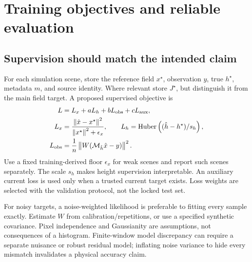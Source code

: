 \section{Training objectives and reliable evaluation}
\label{sec:training}
\subsection{Supervision should match the intended claim}
For each simulation scene, store the reference field $x^\star$, observation $y$, true $h^\star$, metadata $m$, and source identity. Where relevant store $J^\star$, but distinguish it from the main field target. A proposed supervised objective is
\begin{align}
 L &=L_x+aL_h+bL_{\rm obs}+cL_{\rm aux},\\
 L_x&=\frac{\left\lVert\hat x-x^\star\right\rVert^2}{\left\lVert x^\star\right\rVert^2+\epsilon_x},\qquad
 L_h=\operatorname{Huber}\left((\hat h-h^\star)/s_h\right),\\
 L_{\rm obs}&=\frac1{n}\left\lVert W(\mathcal M_{\hat h}\hat x-y)\right\rVert^2.
\end{align}
Use a fixed training-derived floor $\epsilon_x$ for weak scenes and report such scenes separately. The scale $s_h$ makes height supervision interpretable. An auxiliary current loss is used only when a trusted current target exists. Loss weights are selected with the validation protocol, not the locked test set.

For noisy targets, a noise-weighted likelihood is preferable to fitting every sample exactly. Estimate $W$ from calibration/repetitions, or use a specified synthetic covariance. Pixel independence and Gaussianity are assumptions, not consequences of a histogram. Finite-window model discrepancy can require a separate nuisance or robust residual model; inflating noise variance to hide every mismatch invalidates a physical accuracy claim.

